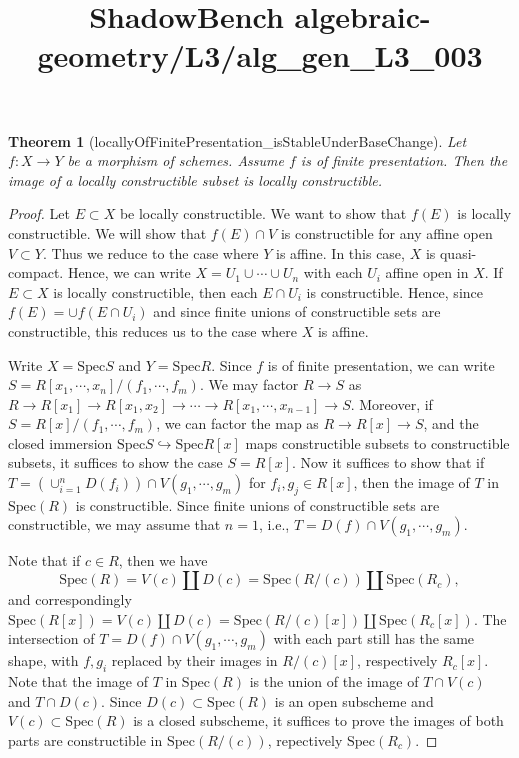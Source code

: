 \documentclass{article}
\title{ShadowBench algebraic-geometry/L3/alg\_gen\_L3\_003}
\newtheorem{theorem}{Theorem}
\begin{document}
\maketitle

\begin{theorem}[locallyOfFinitePresentation_isStableUnderBaseChange] Let $f: X \to Y$ 
be a morphism of schemes. Assume $f$ is of finite presentation. Then the image of a locally constructible subset is locally constructible.    
\end{theorem}
\begin{proof}
    Let $E \subset X$ be locally constructible. We want to show that $f(E)$ is locally constructible. We will show that $f(E) \cap V$ is constructible for any affine open $V \subset Y$. Thus we reduce to the case where $Y$ is affine. In this case, $X$ is quasi-compact. Hence, we can write $X = U_1 \cup \cdots \cup U_n$ with each $U_i$ affine open in $X$. If $E \subset X$ is locally constructible, then each $E \cap U_i$ is constructible. Hence, since $f(E) = \cup f(E \cap U_i)$ and since finite unions of constructible sets are constructible, this reduces us to the case where $X$ is affine.

    Write $X = \mathrm{Spec} S$ and $Y = \mathrm{Spec} R$. Since $f$ is of finite presentation, we can write $S = R[x_1,\cdots,x_n]/(f_1,\cdots,f_m)$. We may factor $R \to S$ as $R \to R[x_1] \to R[x_1,x_2] \to \cdots \to R[x_1,\cdots,x_{n-1}] \to S$. Moreover, if $S = R[x]/(f_1,\cdots,f_m)$, we can factor the map as $R \to R[x] \to S$, and the closed immersion $\mathrm{Spec} S \hookrightarrow \mathrm{Spec} R[x]$ maps constructible subsets to constructible subsets, it suffices to show the case $S=R[x]$. Now it suffices to show that if $T = (\cup_{i=1}^n D(f_i)) \cap V(g_1,\cdots,g_m)$ for $f_i,g_j \in R[x]$, then the image of $T$ in $\mathrm{Spec}(R)$ is constructible. Since finite unions of constructible sets are constructible, we may assume that $n=1$, i.e., $T= D(f) \cap V(g_1,\cdots,g_m)$.

    Note that if $c \in R$, then we have
    \[
        \mathrm{Spec}(R) = V(c) \coprod D(c) = \mathrm{Spec}(R/(c)) \coprod \mathrm{Spec}(R_c),
    \]
    and correspondingly $\mathrm{Spec}(R[x]) = V(c) \coprod D(c) = \mathrm{Spec}(R/(c)[x]) \coprod \mathrm{Spec} (R_c[x])$. The intersection of $T =  D(f) \cap V(g_1,\cdots,g_m)$ with each part still has the same shape, with $f, g_i$ replaced by their images in $R/(c)[x]$, respectively $R_c[x]$. Note that the image of $T$ in $\mathrm{Spec}(R)$ is the union of the image of $T \cap V(c)$ and $T \cap D(c)$. Since $D(c) \subset \mathrm{Spec} (R)$ is an open subscheme and $V(c) \subset \mathrm{Spec}(R)$ is a closed subscheme, it suffices to prove the images of both parts are constructible in $\mathrm{Spec} (R/(c))$, repectively $\mathrm{Spec} (R_c)$.


\end{proof}
\end{document}
